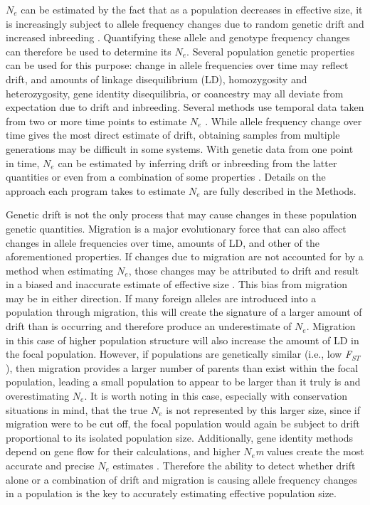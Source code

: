 $N_e$ can be estimated by the fact that as a population decreases in effective size, 
it is increasingly subject to allele frequency changes due to random genetic drift and increased 
inbreeding \citep{Caballero:1994}. Quantifying these allele and genotype frequency changes can therefore 
be used to determine its $N_e$. Several population genetic properties can be used for 
this purpose: change in allele frequencies over time may reflect drift, and amounts of linkage 
disequilibrium (LD), homozygosity and heterozygosity, gene identity disequilibria, or coancestry 
may all deviate from expectation due to drift and inbreeding. Several methods use temporal data 
taken from two or more time points to estimate $N_e$ \citep{Nei:1981, Pollak:1983, Beaumont:2003, 
Wang:2003, Anderson:2005, Jorde:2007}. While allele frequency change over time gives the most 
direct estimate of drift, obtaining samples from multiple generations 
may be difficult in some systems. With genetic data from one point in time, $N_e$ can be 
estimated by inferring drift or inbreeding from the latter quantities \citep{Hill:1981, Pudovkin:1996, Vitalis:2001a, Nomura:2008, Waples:2008, Wang:2009} or even from a combination of %
some properties \citep{Tallmon:2008}. Details on the approach each program takes to estimate 
$N_e$ are fully described in the Methods.

Genetic drift is not the only process that may cause changes in these population genetic 
quantities. Migration is a major evolutionary force that can also affect changes in allele 
frequencies over time, amounts of LD, and other of the aforementioned properties. If changes 
due to migration are not accounted for by a method when estimating $N_e$, those 
changes may be attributed to drift and result in a biased and inaccurate estimate of effective 
size \citep{Wang:2003}. This bias from migration may be in either direction. If many 
foreign alleles are introduced into a population through migration, this will create the signature 
of a larger amount of drift than is occurring and therefore produce an underestimate of 
$N_e$. Migration in this case of higher population structure will also increase 
the amount of LD in the focal population. However, if populations are genetically similar 
(i.e., low \emph{F}$_{ST}$), then migration provides a larger number of parents than exist within the 
focal population, leading a small population to appear to be larger than it truly is and 
overestimating $N_e$. It is worth noting in this case, especially with conservation 
situations in mind, that the true $N_e$ is not represented by this larger size, since 
if migration were to be cut off, the focal population would again be subject to drift proportional 
to its isolated population size. Additionally, gene identity methods depend on gene flow for their 
calculations, and higher $N_e$\emph{m} values create the most accurate and precise %
$N_e$ estimates \citep{Vitalis:2001a, Vitalis:2001b}. Therefore the ability to detect 
whether drift alone or a combination of drift and migration is causing allele frequency 
changes in a population is the key to accurately estimating effective population size.

